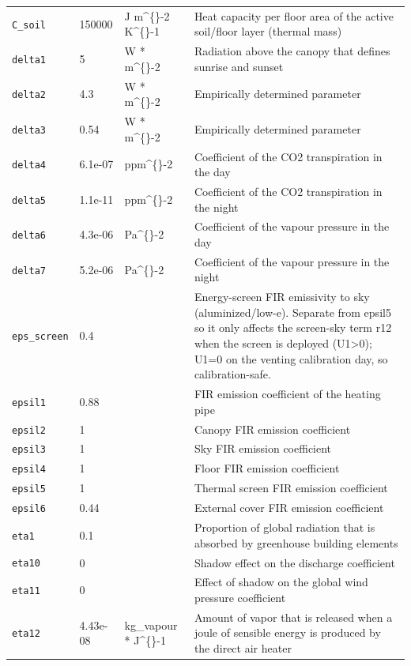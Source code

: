 \documentclass[11pt,a4paper]{article}
\begin{document}
\begin{longtable}{@{}p{} p{} p{} p{}@{}}
\texttt{C\_soil} & 150000 & J m\textasciicircum\{\}-2 K\textasciicircum\{\}-1 & Heat capacity per floor area of the active soil/floor layer (thermal mass)\\
\texttt{delta1} & 5 & W * m\textasciicircum\{\}-2 & Radiation above the canopy that defines sunrise and sunset\\
\texttt{delta2} & 4.3 & W * m\textasciicircum\{\}-2 & Empirically determined parameter\\
\texttt{delta3} & 0.54 & W * m\textasciicircum\{\}-2 & Empirically determined parameter\\
\texttt{delta4} & 6.1e-07 & ppm\textasciicircum\{\}-2 & Coefficient of the CO2 transpiration in the day\\
\texttt{delta5} & 1.1e-11 & ppm\textasciicircum\{\}-2 & Coefficient of the CO2 transpiration in the night\\
\texttt{delta6} & 4.3e-06 & Pa\textasciicircum\{\}-2 & Coefficient of the vapour pressure in the day\\
\texttt{delta7} & 5.2e-06 & Pa\textasciicircum\{\}-2 & Coefficient of the vapour pressure in the night\\
\texttt{eps\_screen} & 0.4 &  & Energy-screen FIR emissivity to sky (aluminized/low-e). Separate from epsil5 so it only affects the screen-sky term r12 when the screen is deployed (U1>0); U1=0 on the venting calibration day, so calibration-safe.\\
\texttt{epsil1} & 0.88 &  & FIR emission coefficient of the heating pipe\\
\texttt{epsil2} & 1 &  & Canopy FIR emission coefficient\\
\texttt{epsil3} & 1 &  & Sky FIR emission coefficient\\
\texttt{epsil4} & 1 &  & Floor FIR emission coefficient\\
\texttt{epsil5} & 1 &  & Thermal screen FIR emission coefficient\\
\texttt{epsil6} & 0.44 &  & External cover FIR emission coefficient\\
\texttt{eta1} & 0.1 &  & Proportion of global radiation that is absorbed by greenhouse building elements\\
\texttt{eta10} & 0 &  & Shadow effect on the discharge coefficient\\
\texttt{eta11} & 0 &  & Effect of shadow on the global wind pressure coefficient\\
\texttt{eta12} & 4.43e-08 & kg\_vapour * J\textasciicircum\{\}-1 & Amount of vapor that is released when a joule of sensible energy is produced by the direct air heater\\

\end{longtable}
\end{document}
